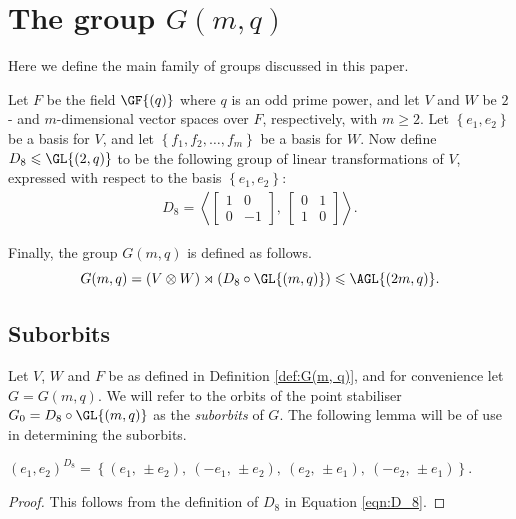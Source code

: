 \section{The group \texorpdfstring{$G{\left(m, q \right)}$}{G(m,q)}}

Here we define the main family of groups discussed in this paper.

\begin{defi} \label{def:G(m, q)}
Let $F$ be the field $\GF{\left(q \right)}$ where $q$ is an odd prime power, and let $V$ and $W$ be $2$- and $m$-dimensional vector spaces over $F$, respectively, with $m \geqslant 2$. Let $\left\{e_1, e_2 \right\}$ be a basis for $V$, and let $\left\{f_1, f_2, \ldots, f_m \right\}$ be a basis for $W$. Now define $D_8 \leqslant \GL{\left(2, q \right)}$ to be the following group of linear transformations of $V$, expressed with respect to the basis $\left\{e_1, e_2 \right\}$:
\begin{align}
D_8 = {\left<{\begin{bmatrix} 1 & 0 \\ 0 & -1 \end{bmatrix}},\ \begin{bmatrix} 0 & 1 \\ 1 & 0 \end{bmatrix} \right>}. \label{eqn:D_8}
\end{align}

Finally, the group $G{\left(m, q \right)}$ is defined as follows.
\begin{displaymath}
G{\left(m, q \right)} = \left(V \otimes W \right) \rtimes \left(D_8 \circ \GL{\left(m, q \right)}\right) \leqslant \AGL{\left(2m, q \right)}.
\end{displaymath}
\end{defi}

\subsection{Suborbits} \label{sc:suborbits}

Let $V$, $W$ and $F$ be as defined in Definition \ref{def:G(m, q)}, and for convenience let $G = G {\left(m, q \right)}$. We will refer to the orbits of the point stabiliser $G_0 = D_8 \circ \GL{\left(m, q \right)}$ as the \emph{suborbits} of $G$. The following lemma will be of use in determining the suborbits.

\begin{lemma} \label{lm:V-basis-under-D8}
$\left(e_1, e_2 \right)^{D_8} = \left\{{\left(e_1,\, \pm e_2 \right)},\ {\left(-e_1,\, \pm e_2 \right)},\ {\left(e_2,\, \pm e_1 \right)},\ \left(-e_2,\, \pm e_1 \right)\right\}$.
\end{lemma}
\begin{proof}
This follows from the definition of $D_8$ in Equation \eqref{eqn:D_8}.
\end{proof}

